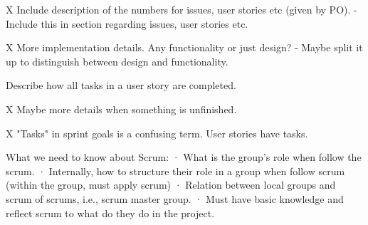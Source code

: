 X   Include description of the numbers for issues, user stories etc (given by PO). 
- Include this in section regarding issues, user stories etc. 

X  More implementation details. Any functionality or just design?
- Maybe split it up to distinguish between design and functionality.

Describe how all tasks in a user story are completed.

X Maybe more details when something is unfinished.

X "Tasks" in sprint goals is a confusing term. User stories have tasks.

What we need to know about Scrum:
· What is the group’s role when follow the scrum.
· Internally, how to structure their role in a group when follow scrum (within the group,  must apply scrum)
· Relation between local groups and scrum of scrums, i.e., scrum master group.
· Must have basic knowledge and reflect scrum to what do they do in the project.

